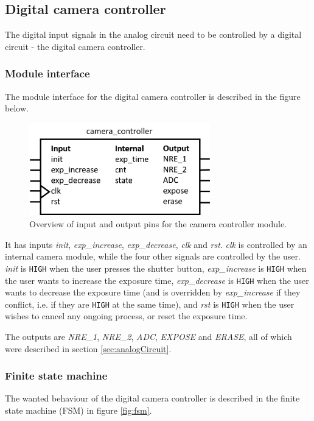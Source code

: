 \subsection{Digital camera controller}
The digital input signals in the analog circuit need to be controlled by a digital circuit - the digital camera controller.

\subsubsection{Module interface}

The module interface for the digital camera controller is described in the figure below.

\begin{figure}[H]
    \centering
    \includegraphics[width=0.7\textwidth]{graphs/camera_controller_pinout.png}
    \caption{Overview of input and output pins for the camera controller module.}
    \label{fig:io}
\end{figure}

It has inputs \emph{init}, \emph{exp\_increase}, \emph{exp\_decrease}, \emph{clk} and \emph{rst}. \emph{clk} is controlled by an internal camera module, while the four other signals are controlled by the user. \emph{init} is \verb|HIGH| when the user presses the shutter button, \emph{exp\_increase} is \verb|HIGH| when the user wants to increase the exposure time, \emph{exp\_decrease} is \verb|HIGH| when the user wants to decrease the exposure time (and is overridden by \emph{exp\_increase} if they conflict, i.e. if they are \verb|HIGH| at the same time), and \emph{rst} is \verb|HIGH| when the user wishes to cancel any ongoing process, or reset the exposure time.

The outputs are \emph{NRE\_1}, \emph{NRE\_2}, \emph{ADC}, \emph{EXPOSE} and \emph{ERASE}, all of which were described in section \ref{sec:analogCircuit}.

\subsubsection{Finite state machine}
The wanted behaviour of the digital camera controller is described in the finite state machine (FSM) in figure \ref{fig:fsm}.

